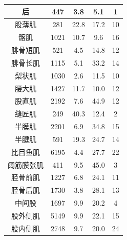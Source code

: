 \begin{table}[htbp]
\begin{tabular}{ccccc}
		后 & 447 &  3.8 & 5.1 & 1 \\
		\midrule
		股薄肌 & 281 &  22.8 & 17.2 & 10 \\
		\midrule
		髂肌 & 1021 &  10.7 & 9.6 & 16 \\
		\midrule
		腓骨短肌 & 521 &  4.5 & 14.8 & 12 \\
		\midrule
		腓骨长肌 & 1115 &  5.1 & 33.2 & 14 \\
		\midrule
		梨状肌 & 1030 &  2.6 & 11.5 & 10 \\
		\midrule
		腰大肌 & 1427 &  11.7 & 10.0 & 12 \\
		\midrule
		股直肌 & 2192 &  7.6 & 44.9 & 12 \\
		\midrule
		缝匠肌 & 249 &  40.3 & 12.4 & 2 \\
		\midrule
		半膜肌 & 2201 &  6.9 & 34.8 & 15 \\
		\midrule
		半腱肌 & 591 &  19.3 & 24.7 & 14 \\
		\midrule
		比目鱼肌 & 6195 &  4.4 & 27.7 & 22 \\
		\midrule
		阔筋膜张肌 & 411 &  9.5 & 45.0 & 3 \\
		\midrule
		胫骨前肌 & 1227 &  6.8 & 24.1 & 11 \\
		\midrule
		胫骨后肌 & 1730 &  3.8 & 28.1 & 13 \\
		\midrule
		中间股 & 1697 &  9.9 & 20.2 & 4 \\
		\midrule
		股外侧肌 & 5149 &  9.9 & 22.1 & 15 \\
		\midrule
		股内侧肌 & 2748 &  9.7 & 20.0 & 24 \\
		\bottomrule
	\end{tabular}
\end{table}



